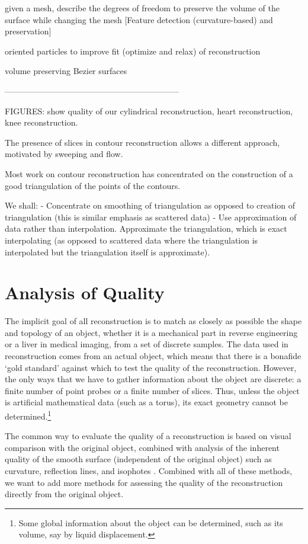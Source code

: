 		given a mesh, describe the degrees of freedom
		to preserve the volume of the surface while changing the mesh
	[Feature detection (curvature-based) and preservation]

		
	oriented particles to improve fit (optimize and relax) of reconstruction	

	volume preserving Bezier surfaces

---------------------------------------------------------------

FIGURES: show quality of our cylindrical reconstruction, heart reconstruction,
knee reconstruction.


The presence of slices in contour reconstruction allows a different approach,
motivated by sweeping and flow.

Most work on contour reconstruction has concentrated on the construction
of a good triangulation of the points of the contours.

We shall: 
- Concentrate on smoothing of triangulation as opposed to creation of triangulation (this is similar emphasis as scattered data)
- Use approximation of data rather than interpolation.
  Approximate the triangulation, which is exact interpolating
  (as opposed to scattered data where the triangulation is interpolated
  but the triangulation itself is approximate).



\section{Analysis of Quality}
\label{sec-quality}

The implicit goal of all reconstruction is to match as closely as possible the
shape and topology of an object, whether it is a mechanical part
in reverse engineering or a liver in medical imaging, 
from a set of discrete samples.
The data used in reconstruction comes from an actual 
object, which means that there is a bonafide `gold standard' against which
to test the quality of the reconstruction.
However, the only ways that we have to gather information about the object
are discrete: a finite number of point probes or a finite number of slices.
Thus, unless the object is artificial mathematical data
(such as a torus), its exact geometry cannot be 
determined.\footnote{Some global information about the object 
	can be determined, such as its volume, say by liquid displacement.}

The common way to evaluate the quality of a reconstruction
is based on visual comparison with the original object,
combined with analysis of the inherent quality of the smooth surface
(independent of the original object) such as curvature, reflection lines,
and isophotes \cite{seidel,hagen,sequin}.
Combined with all of these methods, we want to add more methods for
assessing the quality of the reconstruction directly from the original object.


